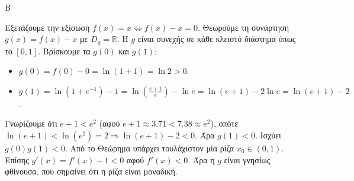 \begin{thema}{Β}
\begin{erwthma}
\item Εξετάζουμε την εξίσωση $f(x) = x \Leftrightarrow f(x) - x = 0$.
Θεωρούμε τη συνάρτηση $g(x) = f(x) - x$ με $D_g = \mathbb{R}$. Η $g$ είναι συνεχής σε κάθε κλειστό διάστημα όπως το $[0, 1]$.
Βρίσκουμε τα $g(0)$ και $g(1)$:
\begin{itemize}
\item $g(0) = f(0) - 0 = \ln(1+1) = \ln 2 > 0$.
\item $g(1) = \ln(1+e^{-1}) - 1 = \ln\left(\frac{e+1}{e}\right) - \ln e = \ln(e+1) - 2\ln e = \ln(e+1) - 2$.
\end{itemize}
Γνωρίζουμε ότι $e+1 < e^2$ (αφού $e+1 \approx 3.71 < 7.38 \approx e^2$), οπότε $\ln(e+1) < \ln(e^2) = 2 \Rightarrow \ln(e+1) - 2 < 0$. Άρα $g(1) < 0$.
Ισχύει $g(0)g(1) < 0$. Από το Θεώρημα  υπάρχει τουλάχιστον μία ρίζα $x_0 \in (0, 1)$.
Επίσης $g'(x) = f'(x) - 1 < 0$ αφού $f'(x) < 0$. Άρα η $g$ είναι γνησίως φθίνουσα, που σημαίνει ότι η ρίζα είναι μοναδική.
\end{erwthma}
\end{thema}


